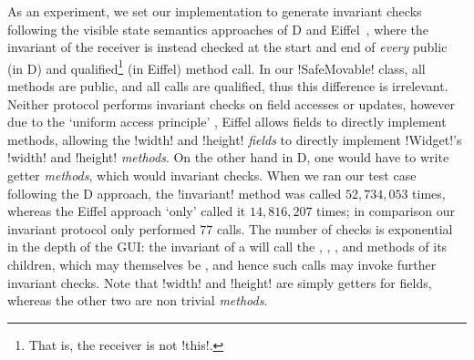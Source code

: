 As an experiment, we set our implementation to generate invariant checks following the  visible state semantics approaches of D and Eiffel~\cite{Alexandrescu:2010:DPL:1875434,DRef},
where the invariant of the receiver is instead checked at the start and end of \emph{every} 
public (in D) and qualified\footnote{That is, the receiver is not \Q!this!.} (in Eiffel) method call.
In our \Q!SafeMovable! class, all methods are public, and all calls  are qualified, thus this difference is irrelevant. Neither protocol performs invariant checks on field accesses or updates,
however due to the `uniform access principle'%
, Eiffel allows fields to directly implement methods,
 allowing the \Q!width! and \Q!height! \emph{fields} to directly implement \Q!Widget!'s \Q!width! and \Q!height! \emph{methods}. On the other hand in D, one would have to write getter \emph{methods}, which would   invariant checks.
When we ran our test case following the D approach, the \Q!invariant! method was called $52,734,053$ times, whereas the Eiffel approach `only' called it $14,816,207$ times; %
in comparison our invariant protocol only performed $77$ calls. The number of checks is exponential in the depth of the GUI: the invariant of a \Q@SafeMovable@ will call the \Q@width@, \Q@height@, \Q@left@, and \Q@top@ methods of its children, which may themselves be \Q@SafeMovable@s, and hence such calls may invoke further invariant checks. Note that \Q!width! and \Q!height! are simply getters for fields, whereas the other two are non trivial \emph{methods}. %


